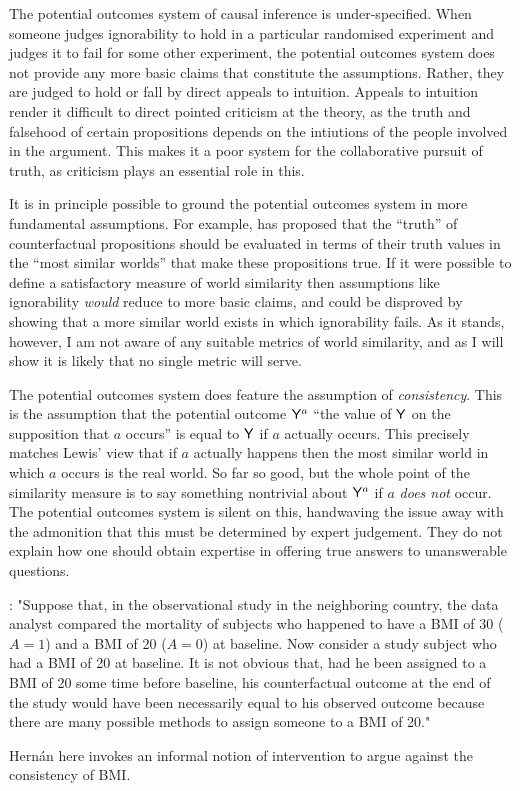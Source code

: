 The potential outcomes system of causal inference is under-specified. When someone judges ignorability to hold in a particular randomised experiment and judges it to fail for some other experiment, the potential outcomes system does not provide any more basic claims that constitute the assumptions. Rather, they are judged to hold or fall by direct appeals to intuition. Appeals to intuition render it difficult to direct pointed criticism at the theory, as the truth and falsehood of certain propositions depends on the intiutions of the people involved in the argument. This makes it a poor system for the collaborative pursuit of truth, as criticism plays an essential role in this.

It is in principle possible to ground the potential outcomes system in more fundamental assumptions. For example, \citet{lewis_causation_1986} has proposed that the ``truth'' of counterfactual propositions should be evaluated in terms of their truth values in the ``most similar worlds'' that make these propositions true. If it were possible to define a satisfactory measure of world similarity then assumptions like ignorability \emph{would} reduce to more basic claims, and could be disproved by showing that a more similar world exists in which ignorability fails. As it stands, however, I am not aware of any suitable metrics of world similarity, and as I will show it is likely that no single metric will serve.

The potential outcomes system does feature the assumption of \emph{consistency}. This is the assumption that the potential outcome $\mathsf{Y}^a$ ``the value of $\mathsf{Y}$ on the supposition that $a$ occurs'' is equal to $\mathsf{Y}$ if $a$ actually occurs. This precisely matches Lewis' view that if $a$ actually happens then the most similar world in which $a$ occurs is the real world. So far so good, but the whole point of the similarity measure is to say something nontrivial about $\mathsf{Y}^a$ if $a$ \emph{does not} occur. The potential outcomes system is silent on this, handwaving the issue away with the admonition that this must be determined by expert judgement. They do not explain how one should obtain expertise in offering true answers to unanswerable questions.

\citet{hernan_does_2008}: "Suppose that, in the observational study in the neighboring country, the data analyst compared the mortality of subjects who happened to have a BMI of 30 ($A = 1$) and a BMI of 20 ($A = 0$) at baseline. Now consider a study subject who had a BMI of 20 at baseline. It is not obvious that, had he been assigned to a BMI of 20 some time before baseline, his counterfactual outcome at the end of the study would have been necessarily equal to his observed outcome because there are many possible methods to assign someone to a BMI of 20."

Hern\'{a}n here invokes an informal notion of intervention to argue against the consistency of BMI.